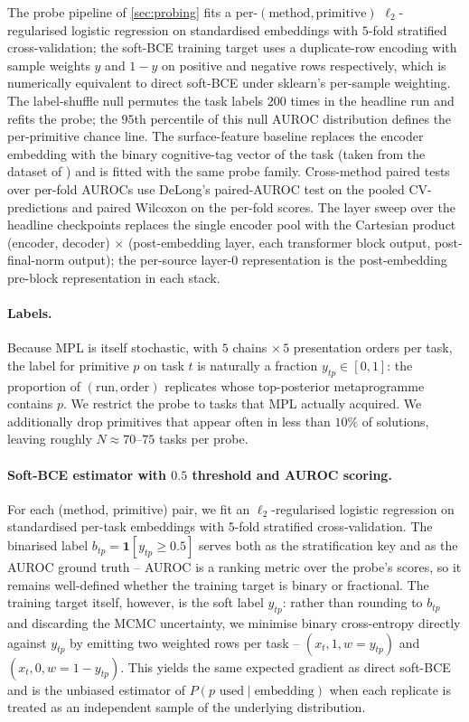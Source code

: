\documentclass[12pt]{article}
\begin{document}
The probe pipeline of \cref{sec:probing} fits a per-$(\mathrm{method}, \mathrm{primitive})$ $\ell_2$-regularised logistic regression on standardised embeddings with $5$-fold stratified cross-validation; the soft-BCE training target uses a duplicate-row encoding with sample weights $y$ and $1 - y$ on positive and negative rows respectively, which is numerically equivalent to direct soft-BCE under sklearn's per-sample weighting. The label-shuffle null permutes the task labels $200$ times in the headline run and refits the probe; the $95$th percentile of this null AUROC distribution defines the per-primitive chance line. The surface-feature baseline replaces the encoder embedding with the binary cognitive-tag vector of the task (taken from the dataset of \citet{rule2024symbolic}) and is fitted with the same probe family. Cross-method paired tests over per-fold AUROCs use DeLong's paired-AUROC test on the pooled CV-predictions and paired Wilcoxon on the per-fold scores. The layer sweep over the headline checkpoints replaces the single encoder pool with the Cartesian product (encoder, decoder) $\times$ (post-embedding layer, each transformer block output, post-final-norm output); the per-source layer-$0$ representation is the post-embedding pre-block representation in each stack.

\paragraph{Labels.} Because MPL is itself stochastic, with $5$ chains $\times\,5$ presentation orders per task, the label for primitive $p$ on task $t$ is naturally a fraction $y_{tp} \in [0, 1]$: the proportion of $(\mathrm{run}, \mathrm{order})$ replicates whose top-posterior metaprogramme contains $p$. We restrict the probe to tasks that MPL actually acquired. We additionally drop primitives that appear often in less than $10\%$ of solutions, leaving roughly $N \approx 70$--$75$ tasks per probe.

\paragraph{Soft-BCE estimator with $0.5$ threshold and AUROC scoring.} For each (method, primitive) pair, we fit an $\ell_2$-regularised logistic regression on standardised per-task embeddings with $5$-fold stratified cross-validation. The binarised label $b_{tp} = \mathbf{1}[y_{tp} \geq 0.5]$ serves both as the stratification key and as the AUROC ground truth -- AUROC is a ranking metric over the probe's scores, so it remains well-defined whether the training target is binary or fractional. The training target itself, however, is the soft label $y_{tp}$: rather than rounding to $b_{tp}$ and discarding the MCMC uncertainty, we minimise binary cross-entropy directly against $y_{tp}$ by emitting two weighted rows per task -- $(x_t, 1, w = y_{tp})$ and $(x_t, 0, w = 1 - y_{tp})$. This yields the same expected gradient as direct soft-BCE and is the unbiased estimator of $P(p \text{ used} \mid \mathrm{embedding})$ when each replicate is treated as an independent sample of the underlying distribution.
\end{document}
